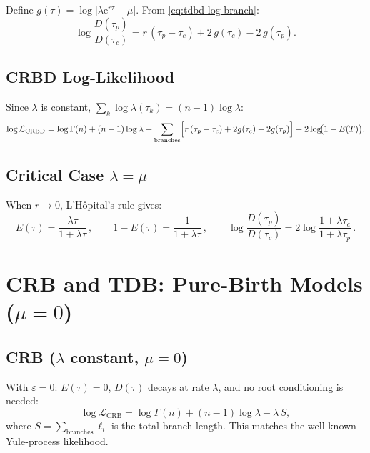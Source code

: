 \documentclass[11pt,a4paper]{article}
\newcommand{\ee}{\mathrm{e}}
\newcommand{\eps}{\varepsilon}
\theoremstyle{plain}
\theoremstyle{definition}
\theoremstyle{remark}
\begin{document}
Define $g(\tau) = \log|\lambda\ee^{r\tau} - \mu|$. From \eqref{eq:tdbd-log-branch}:
\begin{equation}\label{eq:crbd-branch}
  \log\frac{D(\tau_p)}{D(\tau_c)}
  = r\,(\tau_p - \tau_c) + 2\,g(\tau_c) - 2\,g(\tau_p).
\end{equation}

\subsection{CRBD Log-Likelihood}

Since $\lambda$ is constant, $\sum_{k} \log\lambda(\tau_k) = (n-1)\log\lambda$:
\begin{equation}\label{eq:crbd-loglik}
  \log\mathcal{L}_{\text{CRBD}}
  = \log\Gamma(n) + (n-1)\log\lambda
  + \sum_{\text{branches}}\Bigl[r\,(\tau_p - \tau_c) + 2g(\tau_c) - 2g(\tau_p)\Bigr]
  - 2\log\!\bigl(1 - E(T)\bigr).
\end{equation}

\subsection{Critical Case $\lambda = \mu$}

When $r \to 0$, L'H\^opital's rule gives:
\begin{equation}
  E(\tau) = \frac{\lambda\tau}{1 + \lambda\tau}\,,
  \qquad
  1 - E(\tau) = \frac{1}{1 + \lambda\tau}\,,
  \qquad
  \log\frac{D(\tau_p)}{D(\tau_c)} = 2\log\frac{1 + \lambda\tau_c}{1 + \lambda\tau_p}\,.
\end{equation}

\section{CRB and TDB: Pure-Birth Models ($\mu = 0$)}
\label{sec:pure-birth}

\subsection{CRB ($\lambda$ constant, $\mu = 0$)}

With $\eps = 0$: $E(\tau) = 0$, $D(\tau)$ decays at rate $\lambda$, and no root conditioning is needed:
\begin{equation}\label{eq:crb}
  \log\mathcal{L}_{\text{CRB}} = \log\Gamma(n) + (n-1)\log\lambda - \lambda\,S,
\end{equation}
where $S = \sum_{\text{branches}} \ell_i$ is the total branch length. This matches the well-known Yule-process likelihood.
\end{document}
